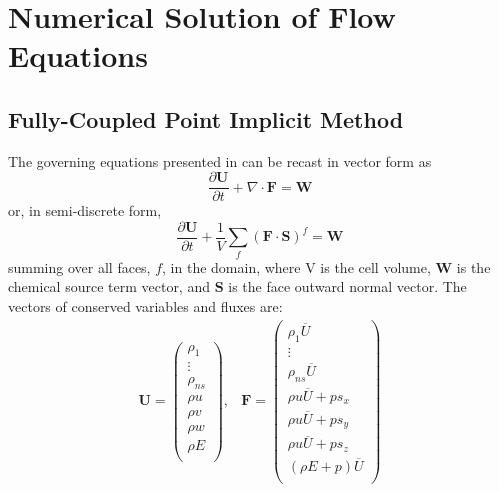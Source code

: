 \chapter{Numerical Solution of Flow Equations}
\label{chapter-three}

\section{Fully-Coupled Point Implicit Method}

The governing equations presented in  can
be recast in vector form as
\begin{equation}
	\label{inv_flux_vec}
	\frac{\partial \mathbf{U}}{\partial t}
	+ \nabla\cdot \mathbf{F} = \mathbf{W}
\end{equation}
 or, in semi-discrete form,
\begin{equation}
	\label{inv_flux_fv}
	\frac{\partial \mathbf{U}}{\partial t}
	 + \frac{1}{V}\sum\limits_{f}(\mathbf{F}\cdot\mathbf{S})^f = \mathbf{W}
 \end{equation}
summing over all faces, $f$, in the domain, where V is the cell volume, 
$\mathbf{W}$ is the chemical source term vector, and $\mathbf{S}$ is the face
outward normal vector.  The vectors of conserved variables and fluxes are:
\begin{equation}
	\begin{matrix}
	\mathbf{U}=\begin{pmatrix}
   		\rho_1\\
		\vdots \\
		\rho_{ns} \\
		\rho u \\
		\rho v \\
		\rho w \\
		\rho E \\
	\end{pmatrix},      &
 	\mathbf{F} = \begin{pmatrix}
		\rho_1  \overline{U} \\
		\vdots \\
		\rho_{ns} \overline{U} \\
		\rho u \overline{U} + p s_x\\
		\rho u \overline{U} + p s_y\\
		\rho u \overline{U} + p s_z\\
		(\rho E + p) \overline{U} \\
	\end{pmatrix}
	\end{matrix}
 \end{equation}
